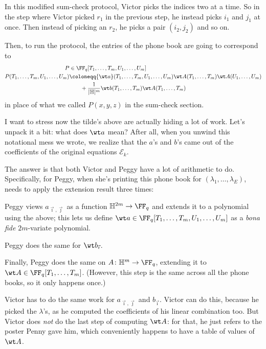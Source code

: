 \documentclass[11pt]{scrreprt}
\newcommand{\HH}{\mathbb H}
\begin{document}
In this modified sum-check protocol, Victor picks the indices two at a time.
So in the step where Victor picked $r_1$ in the previous step,
he instead picks $i_1$ and $j_1$ at once.
Then instead of picking an $r_2$, he picks a pair $(i_2, j_2)$ and so on.

Then, to run the protocol, the entries of the phone book are going to correspond to
\begin{align*}
  P &\in \FF_q[T_1, \dots, T_m, U_1, \dots, U_m] \\
  P(T_1, \dots, T_m, U_1, \dots, U_m) &\coloneqq
    {\wt a}(T_1, \dots, T_m, U_1, \dots, U_m) \wt A(T_1, \dots, T_m) \wt A(U_1, \dots,
    U_m) \\
    &\qquad + \frac{1}{|\HH|^m} {\wt b}(T_1, \dots, T_m) \wt A(T_1, \dots, T_m)
\end{align*}
in place of what we called $P(x,y,z)$ in the sum-check section.

I want to stress now the tilde's above are actually hiding a lot of work.
Let's unpack it a bit: what does $\wt a$ mean?
After all, when you unwind this notational mess we wrote,
we realize that the $a$'s and $b$'s came out of the coefficients of the original
equations $\mathcal E_k$.

The answer is that both Victor and Peggy have a lot of arithmetic to do.
Specifically, for Peggy,
when she's printing this phone book for $(\lambda_1, \dots, \lambda_E)$,
needs to apply the extension result three times:
\begin{itemize}
  \ii Peggy views $a_{\vec\imath, \vec\jmath}$ as a function $\HH^{2m} \to \FF_q$
  and extends it to a polynomial using the above;
  this lets us define
  $\wt a \in \FF_q[T_1, \dots, T_m, U_1, \dots, U_m]$
  as a \emph{bona fide} $2m$-variate polynomial.

  \ii Peggy does the same for $\wt b_{\vec\imath}$.

  \ii Finally, Peggy does the same on $A \colon \HH^m \to \FF_q$,
  extending it to $\wt A \in \FF_q[T_1, \dots, T_m]$.
  (However, this step is the same across all the phone books, so it only happens once.)
\end{itemize}
Victor has to do the same work for $a_{\vec\imath, \vec\jmath}$ and $b_{\vec\imath}$.
Victor can do this, because he picked the $\lambda$'s,
as he computed the coefficients of his linear combination too.
But Victor does \emph{not} do the last step of computing $\wt A$:
for that, he just refers to the poster Penny gave him,
which conveniently happens to have a table of values of $\wt A$.
\end{document}
